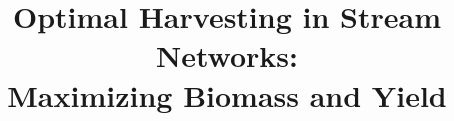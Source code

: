 \documentclass[11pt]{article}
\theoremstyle{definition}
\begin{document}
\title{{\vspace{-80pt}} Optimal Harvesting  in Stream Networks: \\ Maximizing Biomass and Yield
}
\date{}
\author{~}















\end{document}
